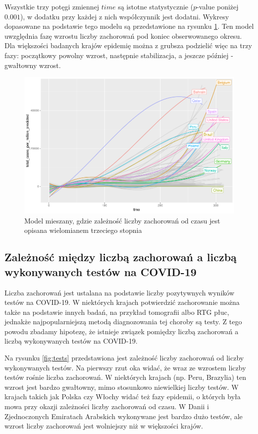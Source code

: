 \documentclass[12pt]{mwbk}
\theoremstyle{plain}
\theoremstyle{definition}
\theoremstyle{definition}
\begin{document}
\newpage

Wszystkie trzy potęgi zmiennej $time$ są istotne statystycznie ($p$-value poniżej $0.001$), w dodatku przy każdej z nich współczynnik jest dodatni. Wykresy dopasowane na podstawie tego modelu są przedstawione na rysunku \ref{fig:mod1_poly_predict}. Ten model uwzględnia fazę wzrostu liczby zachorowań pod koniec obserwowanego okresu. Dla większości badanych krajów epidemię można z grubsza podzielić więc na trzy fazy: początkowy powolny wzrost, następnie stabilizacja, a jeszcze później - gwałtowny wzrost.

\begin{figure}[!h]
	\centering
	\includegraphics[width=\linewidth]{rys/mod1_poly_predict.png}
	
	\caption{Model mieszany, gdzie zależność liczby zachorowań od czasu jest opisana wielomianem trzeciego stopnia}
	\label{fig:mod1_poly_predict}
\end{figure}

\subsection{Zależność między liczbą zachorowań a liczbą wykonywanych testów na COVID-19}

Liczba zachorowań jest ustalana na podstawie liczby pozytywnych wyników testów na COVID-19. W niektórych krajach potwierdzić zachorowanie można także na podstawie innych badań, na przykład tomografii albo RTG płuc, jednakże najpopularniejszą metodą diagnozowania tej choroby są testy. Z tego powodu zbadamy hipotezę, że istnieje związek pomiędzy liczbą zachorowań a liczbą wykonywanych testów na COVID-19.

Na rysunku \ref{fig:tests} przedstawiona jest zależność liczby zachorowań od liczby wykonywanych testów. Na pierwszy rzut oka widać, że wraz ze wzrostem liczby testów rośnie liczba zachorowań. W niektórych krajach (np. Peru, Brazylia) ten wzrost jest bardzo gwałtowny, mimo stosunkowo niewielkiej liczby testów. W krajach takich jak Polska czy Włochy widać też fazy epidemii, o których była mowa przy okazji zależności liczby zachorowań od czasu. W Danii i Zjednoczonych Emiratach Arabskich wykonywane jest bardzo dużo testów, ale wzrost liczby zachorowań jest wolniejszy niż w większości krajów.
\end{document}
